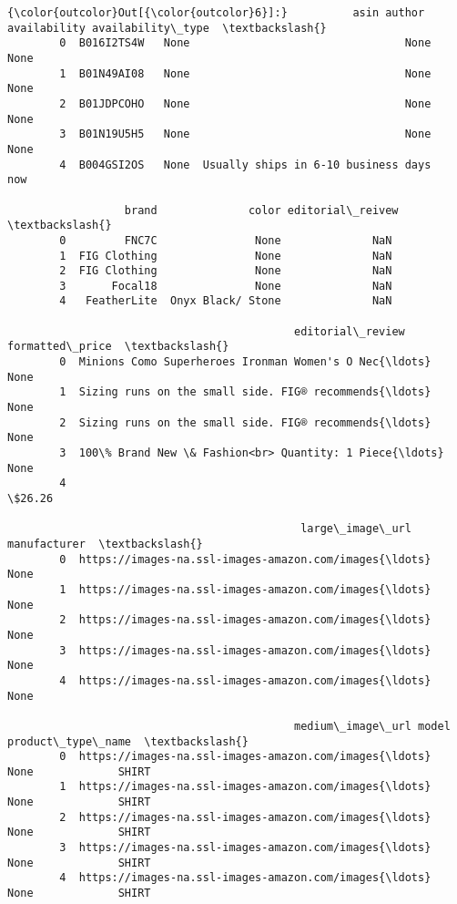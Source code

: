 \documentclass[11pt]{article}
\begin{document}
\begin{Verbatim}[commandchars=\\\{\}]
{\color{outcolor}Out[{\color{outcolor}6}]:}          asin author                         availability availability\_type  \textbackslash{}
        0  B016I2TS4W   None                                 None              None   
        1  B01N49AI08   None                                 None              None   
        2  B01JDPCOHO   None                                 None              None   
        3  B01N19U5H5   None                                 None              None   
        4  B004GSI2OS   None  Usually ships in 6-10 business days               now   
        
                  brand              color editorial\_reivew  \textbackslash{}
        0         FNC7C               None              NaN   
        1  FIG Clothing               None              NaN   
        2  FIG Clothing               None              NaN   
        3       Focal18               None              NaN   
        4   FeatherLite  Onyx Black/ Stone              NaN   
        
                                            editorial\_review formatted\_price  \textbackslash{}
        0  Minions Como Superheroes Ironman Women's O Nec{\ldots}            None   
        1  Sizing runs on the small side. FIG® recommends{\ldots}            None   
        2  Sizing runs on the small side. FIG® recommends{\ldots}            None   
        3  100\% Brand New \& Fashion<br> Quantity: 1 Piece{\ldots}            None   
        4                                                             \$26.26   
        
                                             large\_image\_url manufacturer  \textbackslash{}
        0  https://images-na.ssl-images-amazon.com/images{\ldots}         None   
        1  https://images-na.ssl-images-amazon.com/images{\ldots}         None   
        2  https://images-na.ssl-images-amazon.com/images{\ldots}         None   
        3  https://images-na.ssl-images-amazon.com/images{\ldots}         None   
        4  https://images-na.ssl-images-amazon.com/images{\ldots}         None   
        
                                            medium\_image\_url model product\_type\_name  \textbackslash{}
        0  https://images-na.ssl-images-amazon.com/images{\ldots}  None             SHIRT   
        1  https://images-na.ssl-images-amazon.com/images{\ldots}  None             SHIRT   
        2  https://images-na.ssl-images-amazon.com/images{\ldots}  None             SHIRT   
        3  https://images-na.ssl-images-amazon.com/images{\ldots}  None             SHIRT   
        4  https://images-na.ssl-images-amazon.com/images{\ldots}  None             SHIRT   
        

\end{Verbatim}
\end{document}
